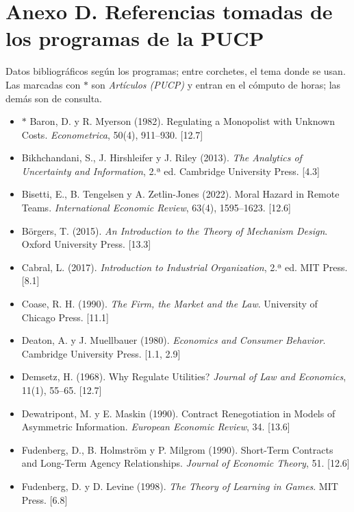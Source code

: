 \documentclass[11pt,a4paper]{article}
\begin{document}
\bigskip
\section*{Anexo D. Referencias tomadas de los programas de la PUCP}

Datos bibliográficos según los programas; entre corchetes, el tema donde se
usan. Las marcadas con $\ast$ son \emph{Artículos (PUCP)} y entran en el
cómputo de horas; las demás son de consulta.

\medskip
{\small
\begin{itemize}[leftmargin=1.4em,itemsep=1pt,label={}]
\item $\ast$ Baron, D. y R. Myerson (1982). Regulating a Monopolist with Unknown Costs. \emph{Econometrica}, 50(4), 911--930. [12.7]
\item Bikhchandani, S., J. Hirshleifer y J. Riley (2013). \emph{The Analytics of Uncertainty and Information}, 2.ª ed. Cambridge University Press. [4.3]
\item Bisetti, E., B. Tengelsen y A. Zetlin-Jones (2022). Moral Hazard in Remote Teams. \emph{International Economic Review}, 63(4), 1595--1623. [12.6]
\item Börgers, T. (2015). \emph{An Introduction to the Theory of Mechanism Design}. Oxford University Press. [13.3]
\item Cabral, L. (2017). \emph{Introduction to Industrial Organization}, 2.ª ed. MIT Press. [8.1]
\item Coase, R. H. (1990). \emph{The Firm, the Market and the Law}. University of Chicago Press. [11.1]
\item Deaton, A. y J. Muellbauer (1980). \emph{Economics and Consumer Behavior}. Cambridge University Press. [1.1, 2.9]
\item Demsetz, H. (1968). Why Regulate Utilities? \emph{Journal of Law and Economics}, 11(1), 55--65. [12.7]
\item Dewatripont, M. y E. Maskin (1990). Contract Renegotiation in Models of Asymmetric Information. \emph{European Economic Review}, 34. [13.6]
\item Fudenberg, D., B. Holmström y P. Milgrom (1990). Short-Term Contracts and Long-Term Agency Relationships. \emph{Journal of Economic Theory}, 51. [12.6]
\item Fudenberg, D. y D. Levine (1998). \emph{The Theory of Learning in Games}. MIT Press. [6.8]

\end{itemize}}
\end{document}
